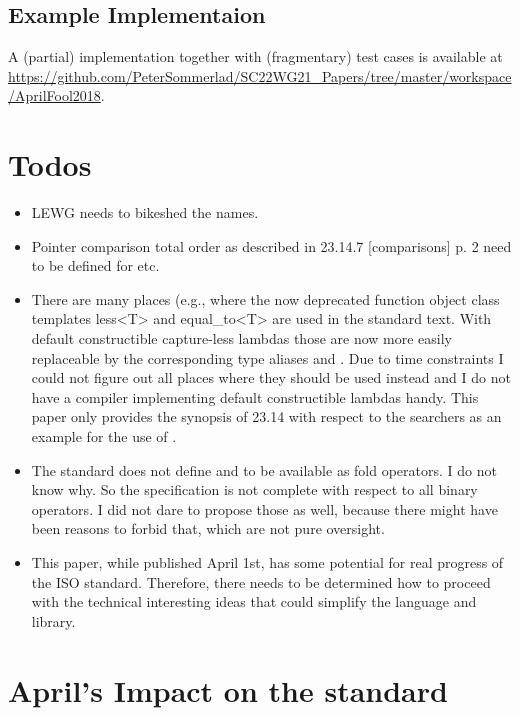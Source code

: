 \documentclass[ebook,11pt,article]{memoir}
\begin{document}
\section{Example Implementaion}
A (partial) implementation together with (fragmentary) test cases is available at \url{https://github.com/PeterSommerlad/SC22WG21_Papers/tree/master/workspace/AprilFool2018}.
\chapter{Todos}
\begin{itemize}
\item
LEWG needs to bikeshed the names.

\item
Pointer comparison total order as described in 23.14.7 [comparisons] p. 2 need to be defined for  etc.

\item 
There are many places (e.g., where the now deprecated function object class templates less<T> and equal_to<T> are used in the standard text. With default constructible capture-less lambdas those are now more easily replaceable by the corresponding type aliases  and . Due to time constraints I could not figure out all places where they should be used instead and I do not have a compiler implementing default constructible lambdas handy. This paper only provides the synopsis of 23.14 with respect to the searchers as an example for the use of .

\item
The standard does not define \tcode{\&\&=} and \tcode{||=} to be available as fold operators. I do not know why. So the specification is not complete with respect to all binary operators. I did not dare to propose those as well, because there might have been reasons to forbid that, which are not pure oversight.

\item
This paper, while published April 1st, has some potential for real progress of the ISO \Cpp{} standard. Therefore, there needs to be determined how to proceed with the technical interesting ideas that could simplify the language and library.
\end{itemize}

\chapter{April's Impact on the standard}
\end{document}
